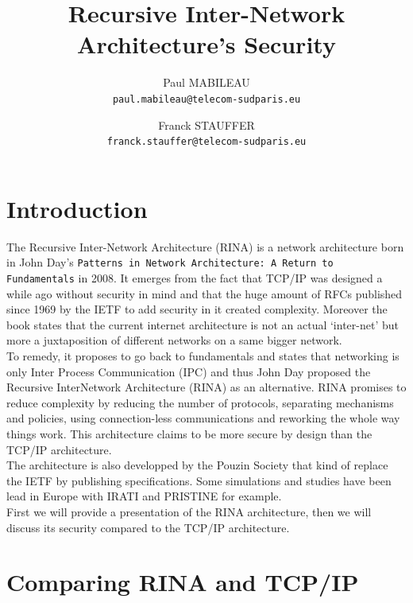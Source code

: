 \documentclass[a4paper]{proc}
\author{Paul MABILEAU\\\texttt{paul.mabileau@telecom-sudparis.eu} \and Franck STAUFFER\\\texttt{franck.stauffer@telecom-sudparis.eu}}
\title{\textbf{Recursive Inter-Network Architecture's Security}}
\begin{document}
\maketitle
\tableofcontents
\newpage
\part{Introduction}
The Recursive Inter-Network Architecture (RINA) is a network architecture born in John Day's \texttt{Patterns in Network Architecture: A Return to Fundamentals} in 2008.
It emerges from the fact that TCP/IP was designed a while ago without security in mind and that the huge amount of RFCs\cite{rfc} published since 1969 by the IETF to add security in it created complexity.\cite{assessing-security}
Moreover the book states that the current internet architecture is not an actual `inter-net' but more a juxtaposition of different networks on a same bigger network.
\\To remedy, it proposes to go back to fundamentals and states that networking is only Inter Process Communication (IPC) and thus John Day proposed the Recursive InterNetwork Architecture (RINA) as an alternative.
RINA promises to reduce complexity by reducing the number of protocols, separating mechanisms and policies, using connection-less communications and reworking the whole way things work.
This architecture claims to be more secure by design than the TCP/IP architecture.
\\The architecture is also developped by the Pouzin Society\cite{psoc} that kind of replace the IETF by publishing specifications.
Some simulations and studies have been lead in Europe with IRATI\cite{web:irati} and PRISTINE\cite{pristine} for example.
\\First we will provide a presentation of the RINA architecture, then we will discuss its security compared to the TCP/IP architecture.
\newpage

\part{Comparing RINA and TCP/IP}
\end{document}
